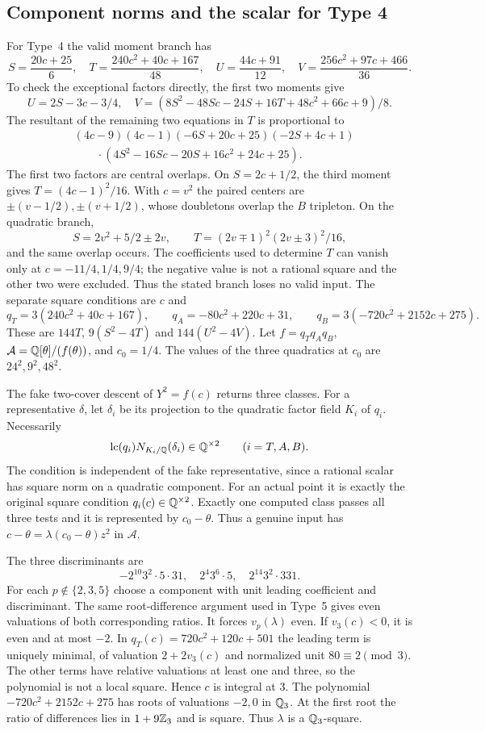 \subsection{Component norms and the scalar for Type 4}\label{detail:type4}
For Type~4 the valid moment branch has
\[
 S=\frac{20c+25}{6},\quad T=\frac{240c^2+40c+167}{48},
 \quad U=\frac{44c+91}{12},\quad V=\frac{256c^2+97c+466}{36}.
\]
To check the exceptional factors directly, the first two moments give
\[
 U=2S-3c-3/4,\quad
 V=(8S^2-48Sc-24S+16T+48c^2+66c+9)/8.
\]
The resultant of the remaining two equations in $T$ is proportional to
\[
\begin{split}
 &(4c-9)(4c-1)(-6S+20c+25)(-2S+4c+1)\\
 &\qquad\cdot(4S^2-16Sc-20S+16c^2+24c+25).
\end{split}
\]
The first two factors are central overlaps. On $S=2c+1/2$, the third
moment gives $T=(4c-1)^2/16$. With $c=v^2$ the paired centers are
$\pm(v-1/2),\pm(v+1/2)$, whose doubletons overlap the $B$ tripleton.
On the quadratic branch,
\[
 S=2v^2+5/2\pm2v,\qquad
 T=(2v\mp1)^2(2v\pm3)^2/16,
\]
and the same overlap occurs. The coefficients used to determine $T$
can vanish only at $c=-11/4,1/4,9/4$; the negative value is not a
rational square and the other two were excluded. Thus the stated
branch loses no valid input.
The separate square conditions are $c$ and
\[
 q_T=3(240c^2+40c+167),\qquad
 q_A=-80c^2+220c+31,\qquad
 q_B=3(-720c^2+2152c+275).
\]
These are $144T$, $9(S^2-4T)$ and $144(U^2-4V)$.
Let $f=q_Tq_Aq_B$, $\mathcal A=\mathbb Q[\theta]/(f(\theta))$,
and $c_0=1/4$. The values of the three quadratics at $c_0$ are
$24^2,9^2,48^2$.

The fake two-cover descent of $Y^2=f(c)$ returns three classes.
For a representative $\delta$, let $\delta_i$ be its projection
to the quadratic factor field $K_i$ of $q_i$. Necessarily
\[
 \operatorname{lc}(q_i)N_{K_i/\mathbb Q}(\delta_i)
       \in\mathbb Q^{\times2}\qquad(i=T,A,B).
\]
The condition is independent of the fake representative, since a
rational scalar has square norm on a quadratic component.
For an actual point it is exactly the original square condition
$q_i(c)\in\mathbb Q^{\times2}$. Exactly one computed class passes
all three tests and it is represented by $c_0-\theta$.
Thus a genuine input has
$c-\theta=\lambda(c_0-\theta)z^2$ in $\mathcal A$.

The three discriminants are
\[
 -2^{10}3^2\cdot5\cdot31,\quad 2^4 3^6\cdot5,
 \quad 2^{14}3^2\cdot331.
\]
For each $p\notin\{2,3,5\}$ choose a component with unit leading
coefficient and discriminant. The same root-difference argument used
in Type~5 gives even valuations of both corresponding ratios. It
forces $v_p(\lambda)$ even.
If $v_3(c)<0$, it is even and at most $-2$. In
$q_T(c)=720c^2+120c+501$ the leading term is uniquely minimal,
of valuation $2+2v_3(c)$ and normalized unit $80\equiv2\pmod3$.
The other terms have relative valuations at least one and three,
so the polynomial is not a local square. Hence $c$ is integral at 3.
The polynomial $-720c^2+2152c+275$ has roots of valuations $-2,0$
in $\mathbb Q_3$. At the first root the ratio of differences lies
in $1+9\mathbb Z_3$ and is square. Thus $\lambda$ is a
$\mathbb Q_3$-square.


